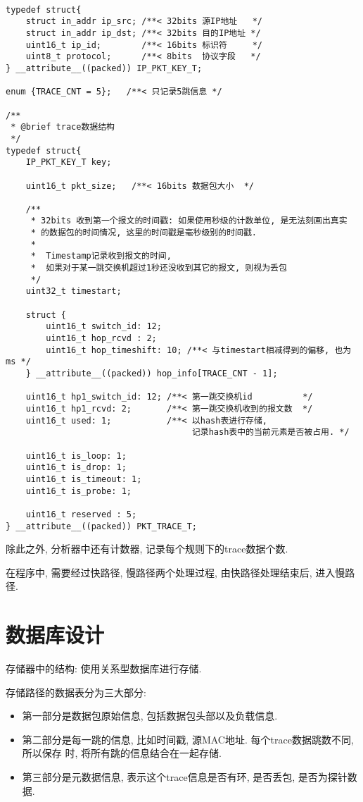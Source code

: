 \begin{lstlisting}

typedef struct{
    struct in_addr ip_src; /**< 32bits 源IP地址   */
    struct in_addr ip_dst; /**< 32bits 目的IP地址 */
    uint16_t ip_id;        /**< 16bits 标识符     */
    uint8_t protocol;      /**< 8bits  协议字段   */
} __attribute__((packed)) IP_PKT_KEY_T;

enum {TRACE_CNT = 5};   /**< 只记录5跳信息 */

/**
 * @brief trace数据结构
 */
typedef struct{
    IP_PKT_KEY_T key;

    uint16_t pkt_size;   /**< 16bits 数据包大小  */

    /**
     * 32bits 收到第一个报文的时间戳: 如果使用秒级的计数单位, 是无法刻画出真实
     * 的数据包的时间情况, 这里的时间戳是毫秒级别的时间戳.
     *
     *  Timestamp记录收到报文的时间,
     *  如果对于某一跳交换机超过1秒还没收到其它的报文, 则视为丢包
     */
    uint32_t timestart;

    struct {
        uint16_t switch_id: 12;
        uint16_t hop_rcvd : 2;
        uint16_t hop_timeshift: 10; /**< 与timestart相减得到的偏移, 也为ms */
    } __attribute__((packed)) hop_info[TRACE_CNT - 1];

    uint16_t hp1_switch_id: 12; /**< 第一跳交换机id          */
    uint16_t hp1_rcvd: 2;       /**< 第一跳交换机收到的报文数  */
    uint16_t used: 1;           /**< 以hash表进行存储,
                                     记录hash表中的当前元素是否被占用. */

    uint16_t is_loop: 1;
    uint16_t is_drop: 1;
    uint16_t is_timeout: 1;
    uint16_t is_probe: 1;

    uint16_t reserved : 5;
} __attribute__((packed)) PKT_TRACE_T;
\end{lstlisting}


除此之外, 分析器中还有计数器, 记录每个规则下的trace数据个数.

在程序中, 需要经过快路径, 慢路径两个处理过程, 由快路径处理结束后,
进入慢路径.

\section{数据库设计}

存储器中的结构: 使用关系型数据库进行存储.

存储路径的数据表分为三大部分:

\begin{itemize}
    \setlength\itemsep{0.1em}
    \item 第一部分是数据包原始信息, 包括数据包头部以及负载信息.
    \item 第二部分是每一跳的信息, 比如时间戳, 源MAC地址. 每个trace数据跳数不同,
            所以保存 时, 将所有跳的信息结合在一起存储.
    \item 第三部分是元数据信息, 表示这个trace信息是否有环, 是否丢包,
            是否为探针数据.
\end{itemize}


